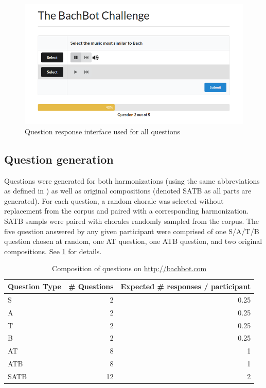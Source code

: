 \documentclass[dissertation.tex]{subfiles}
\begin{document}
\begin{figure}[htpb]
  \centering
  \includegraphics[width=1.0\linewidth]{Figures/question-screen.png}
  \caption{Question response interface used for all questions}
  \label{fig:question-screen}
\end{figure}

\subsection{Question generation}

Questions were generated for both harmonizations (using the same abbreviations
as defined in ) as well as original compositions (denoted SATB as all parts
are generated). For each question, a random chorale was selected without
replacement from the corpus and paired with a corresponding harmonization.
SATB sampls were paired with chorales randomly sampled from the corpus. The
five question answered by any given participant were comprised of one S/A/T/B
question chosen at random, one AT question, one ATB question, and two original
compositions. See
\cref{tab:bachbot-com-question-distribtion} for details.

\begin{table}[htpb]
  \centering
  \begin{tabular}{lrr}
    \toprule
    Question Type & \# Questions &  Expected \# responses / participant \\
    \midrule
    S        & 2  & 0.25 \\
    A        & 2  & 0.25 \\
    T        & 2  & 0.25 \\
    B        & 2  & 0.25 \\
    AT       & 8  & 1 \\
    ATB      & 8  & 1 \\
    SATB     & 12 & 2 \\
    \bottomrule
  \end{tabular}
  \caption{Composition of questions on \url{http://bachbot.com}}
  \label{tab:bachbot-com-question-distribtion}
\end{table}
\end{document}
